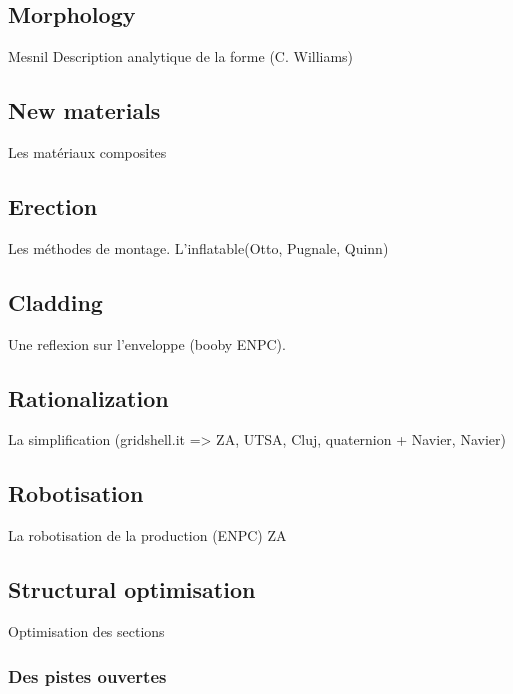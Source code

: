 \cite{DuPeloux2011}
\cite{Lafuente2015}

\subsection{Morphology}
\cite{Douthe2016a}
\cite{Jensen2013}
Mesnil
Description analytique de la forme (C. Williams)

\subsection{New materials}
\cite{Douthe2010a}
\cite{Kotelnikova2012}
\cite{Kotelnikova2013}
Les matériaux composites

\subsection{Erection}
Les méthodes de montage. L'inflatable(Otto, Pugnale, Quinn)
\cite{IL10}
\cite{Quinn2014}
\cite{Liuti2015}
\citet{Liuti2016}

\subsection{Cladding}
Une reflexion sur l'enveloppe (booby ENPC).
\citet{Lafuente2014}
\citet{Cuvilliers2017}
\cite{Filz2015}

\subsection{Rationalization}
La simplification (gridshell.it => ZA, UTSA, Cluj, quaternion + Navier, Navier)

\subsection{Robotisation}
La robotisation de la production (ENPC)
\cite{Menges2016}
ZA

\subsection{Structural optimisation}
Optimisation des sections
\cite{DAmico2015}










\clearpage

\subsubsection{Des pistes ouvertes}











